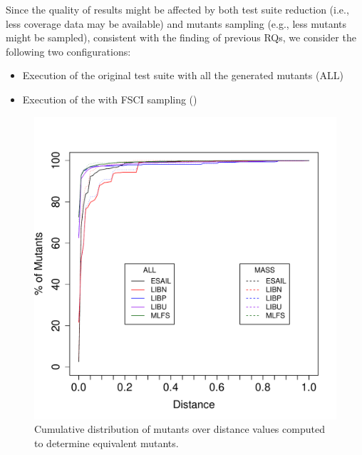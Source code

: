 Since the quality of results might be affected by both test suite reduction (i.e., less coverage data may be available) and mutants sampling (e.g., less mutants might be sampled), consistent with the finding of previous RQs, we consider the following two configurations: 
\begin{itemize}
\item Execution of the original test suite with all the generated mutants (ALL)
\item Execution of the \MPTS with FSCI sampling (\APPR)
\end{itemize}

\begin{figure}[tb]
\begin{center}
\includegraphics[width=\columnwidth]{data/distanceFequency_Equivalent.pdf}
\caption{Cumulative distribution of mutants over distance values computed to determine equivalent mutants.}
\label{fig:results:test:dde}
\end{center}
\end{figure}


